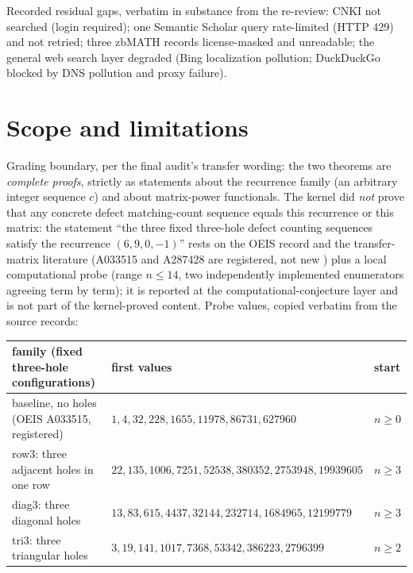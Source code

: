 \documentclass[11pt]{article}
\begin{document}
Recorded residual gaps, verbatim in substance from the re-review: CNKI not
searched (login required); one Semantic Scholar query rate-limited (HTTP
429) and not retried; three zbMATH records license-masked and unreadable;
the general web search layer degraded (Bing localization pollution;
DuckDuckGo blocked by DNS pollution and proxy failure).

\section{Scope and limitations}\label{sec:scope}

Grading boundary, per the final audit's transfer wording: the two theorems
are \emph{complete proofs}, strictly as statements about the recurrence
family (an arbitrary integer sequence $c$) and about matrix-power
functionals. The kernel did \emph{not} prove that any concrete defect
matching-count sequence equals this recurrence or this matrix: the
statement ``the three fixed three-hole defect counting sequences satisfy
the recurrence $(6,9,0,-1)$'' rests on the OEIS record and the
transfer-matrix literature (A033515 and A287428 are registered, not new
\cite{oeis-a033515,oeis-a287428,lundow1996,lundow1998}) plus a local
computational probe (range $n \leq 14$, two independently implemented
enumerators agreeing term by term); it is reported at the
computational-conjecture layer and is not part of the kernel-proved
content. Probe values, copied verbatim from the source records:

\begin{center}
\begin{tabular}{lll}
\hline
family (fixed three-hole configurations) & first values & start \\
\hline
baseline, no holes (OEIS A033515, registered) &
$1, 4, 32, 228, 1655, 11978, 86731, 627960$ & $n \geq 0$ \\
row3: three adjacent holes in one row &
$22, 135, 1006, 7251, 52538, 380352, 2753948, 19939605$ & $n \geq 3$ \\
diag3: three diagonal holes &
$13, 83, 615, 4437, 32144, 232714, 1684965, 12199779$ & $n \geq 3$ \\
tri3: three triangular holes &
$3, 19, 141, 1017, 7368, 53342, 386223, 2796399$ & $n \geq 2$ \\
\hline
\end{tabular}
\end{center}
\end{document}

